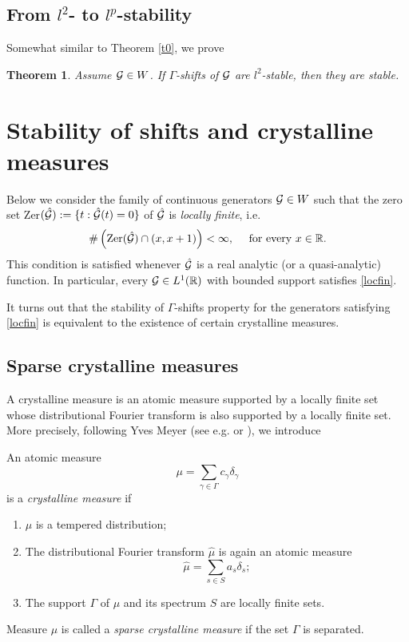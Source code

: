 \documentclass[12pt]{amsart}
\numberwithin{equation}{section}
\newtheorem{theorem}{Theorem}[section]
\newcommand{\R}{{\mathbb R}} \newcommand{\Q}{{\mathbb Q}} \newcommand{\Z}{{\mathbb Z}} \newcommand{\N}{{\mathbb N}}
\begin{document}
\subsection{From  \texorpdfstring{$l^2$}{l2}- to  \texorpdfstring{$l^p$}{lp}-stability} Somewhat similar to  Theorem \ref{t0}, we prove
\begin{theorem}\label{t1}
     Assume $\mathcal{G}\in W$. If $\Gamma$-shifts of $\mathcal{G}$ are $l^2$-stable, then they are stable.
\end{theorem}


\section{Stability of shifts and crystalline measures}\label{Sec_stab_quasicrystal}
Below we consider the family of continuous generators $\mathcal{G}\in W$ such that the
zero set  Zer$(\hat{\mathcal{G}}):=\{t:\hat{\mathcal{G}}(t)=0\}$ of  $\hat{\mathcal{G}}$ is {\it locally finite}, i.e.
\begin{equation}\label{locfin}
     \#\left(\mbox{Zer}(\hat\Ff) \cap (x,x+1)\right) < \infty,\quad  \mbox{ for every } x\in\R.
\end{equation}
This condition is satisfied whenever $\hat{\mathcal{G}}$ is a real analytic (or a quasi-analytic) function.
In particular, every  $\Ff\in L^1(\R)$ with bounded support satisfies \eqref{locfin}. 


It turns out that the stability of $\Gamma$-shifts property for the generators satisfying \eqref{locfin} is equivalent to the existence of certain crystalline measures.

\subsection{Sparse crystalline measures} A crystalline measure is an atomic measure supported by a locally ﬁnite set whose distributional Fourier transform is also supported by a locally ﬁnite set. More precisely, following Yves Meyer {\rm(}see e.g. \cite{MR3482845} or \cite{Meyer_TN}{\rm)}, we introduce

\begin{definition}
An  atomic measure $$\mu=\sum_{\gamma\in\Gamma}c_\gamma\delta_\gamma$$is a {\it crystalline measure} if 
\begin{enumerate}
    \item[\bf (i)] $\mu$ is a tempered distribution{\rm;}
    \item[\bf (ii)] The distributional Fourier transform $\hat\mu$ is again an atomic measure $$\hat\mu=\sum_{s\in S}a_s\delta_s;$$
    \item[\bf (iii)] The support $\Gamma$ of $\mu$ and its spectrum  $S$  are locally finite sets.
\end{enumerate}

Measure $\mu$ is called a {\it sparse crystalline measure} if the set $\Gamma$ is separated.
\end{definition}
\end{document}
